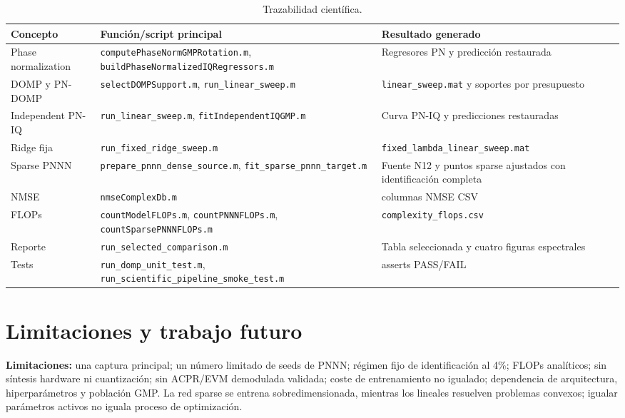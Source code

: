 \documentclass[10pt,a4paper]{article}
\begin{document}
\begin{table}[H]
\centering\small
\caption{Trazabilidad científica.}
\begin{tabularx}{\linewidth}{@{}lXX@{}}
\toprule
Concepto & Función/script principal & Resultado generado\\
\midrule
Phase normalization & \texttt{computePhaseNormGMPRotation.m}, \texttt{buildPhaseNormalizedIQRegressors.m} & Regresores PN y predicción restaurada\\
DOMP y PN-DOMP & \texttt{selectDOMPSupport.m}, \texttt{run\_linear\_sweep.m} & \texttt{linear\_sweep.mat} y soportes por presupuesto\\
Independent PN-IQ & \texttt{run\_linear\_sweep.m}, \texttt{fitIndependentIQGMP.m} & Curva PN-IQ y predicciones restauradas\\
Ridge fija & \texttt{run\_fixed\_ridge\_sweep.m} & \texttt{fixed\_lambda\_linear\_sweep.mat}\\
Sparse PNNN & \texttt{prepare\_pnnn\_dense\_source.m}, \texttt{fit\_sparse\_pnnn\_target.m} & Fuente N12 y puntos sparse ajustados con identificación completa\\
NMSE & \texttt{nmseComplexDb.m} & columnas NMSE CSV\\
FLOPs & \texttt{countModelFLOPs.m}, \texttt{countPNNNFLOPs.m}, \texttt{countSparsePNNNFLOPs.m} & \texttt{complexity\_flops.csv}\\
Reporte & \texttt{run\_selected\_comparison.m} & Tabla seleccionada y cuatro figuras espectrales\\
Tests & \texttt{run\_domp\_unit\_test.m}, \texttt{run\_scientific\_pipeline\_smoke\_test.m} & asserts PASS/FAIL\\
\bottomrule
\end{tabularx}
\end{table}

\section{Limitaciones y trabajo futuro}

\textbf{Limitaciones:} una captura principal; un número limitado de seeds de
PNNN; régimen fijo de identificación al 4\%; FLOPs analíticos; sin síntesis
hardware ni cuantización; sin ACPR/EVM demodulada validada; coste de entrenamiento
no igualado; dependencia de arquitectura, hiperparámetros y población GMP. La
red sparse se entrena sobredimensionada, mientras los lineales resuelven problemas
convexos; igualar parámetros activos no iguala proceso de optimización.
\end{document}
